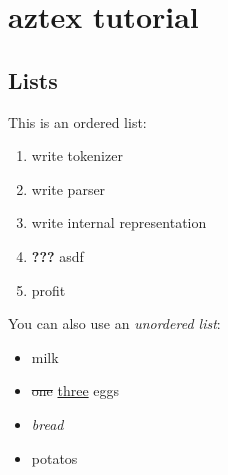 \documentclass{article}
\begin{document}
\section{aztex tutorial}
\subsection{Lists}
This is an ordered list:
\begin{enumerate}
\item write tokenizer

\item write parser

\item write internal representation

\item \textbf{???} asdf

\item profit

\end{enumerate}
You can also use an \textit{unordered list}:
\begin{itemize}
\item milk

\item \sout{one} \underline{three} eggs

\item \textit{bread}

\item potatos

\end{itemize}
\end{document}
